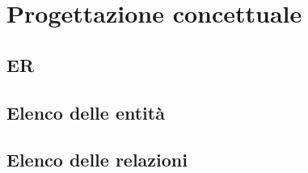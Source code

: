 \section{Progettazione concettuale}
\subsection{ER}
\subsection{Elenco delle entità}
\subsection{Elenco delle relazioni}